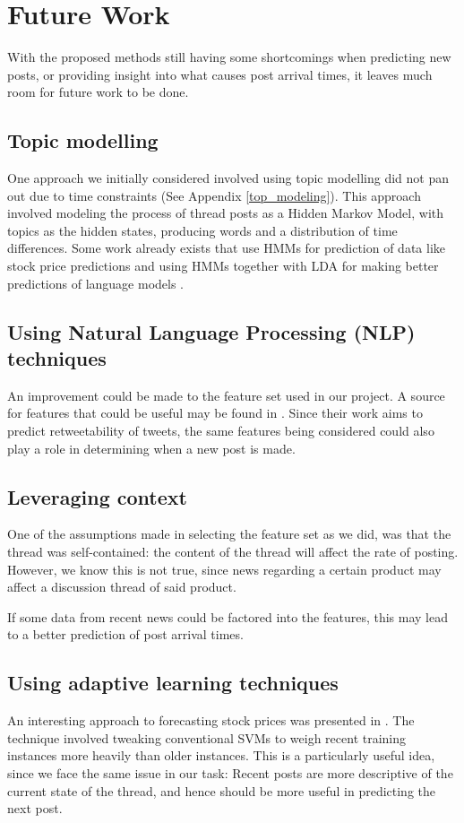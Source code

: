 \section{Future Work}
With the proposed methods still having some shortcomings when predicting new 
posts, or providing insight into what causes post arrival times, it leaves much 
room for future work to be done.

\subsection{Topic modelling}
One approach we initially considered involved using topic modelling did not pan 
out due to time constraints (See Appendix \ref{top_modeling}). This approach 
involved modeling the process of thread posts as a Hidden Markov Model, with 
topics as the hidden states, producing words and a distribution of time 
differences. Some work already exists that use HMMs for prediction of data like 
stock price predictions \cite{Gonzalez2005} and using HMMs together with LDA for 
making better predictions of language models \cite{Hsu2006}.

\subsection{Using Natural Language Processing (NLP) techniques}
An improvement could be made to the feature set used in our project. A source 
for features that could be useful may be found in . Since their 
work aims to predict retweetability of tweets, the same features being 
considered could also play a role in determining when a new post is made.

\subsection{Leveraging context}
One of the assumptions made in selecting the feature set as we did, was that the 
thread was self-contained: the content of the thread will affect the rate of 
posting. However, we know this is not true, since news regarding a certain 
product may affect a discussion thread of said product.

If some data from recent news could be factored into the features, this may lead 
to a better prediction of post arrival times.

\subsection{Using adaptive learning techniques}
An interesting approach to forecasting stock prices was presented in 
. The technique involved tweaking conventional SVMs to weigh 
recent training instances more heavily than older instances. This is a 
particularly useful idea, since we face the same issue in our task: Recent posts 
are more descriptive of the current state of the thread, and hence should be 
more useful in predicting the next post.
